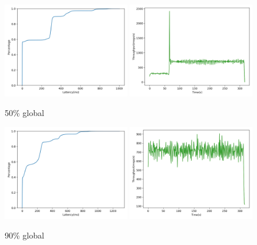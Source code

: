 \begin{figure}[!htb]
  \centering
  \includegraphics[width=0.49\textwidth,height=\textheight,keepaspectratio]{img/global50_lat.png}
  \includegraphics[width=0.49\textwidth,height=\textheight,keepaspectratio]{img/global50_tp.png}
  \caption{ 50\% global }
  \label{fig:global50-performance}
\end{figure}

\begin{figure}[!htb]
  \centering
  \includegraphics[width=0.49\textwidth,height=\textheight,keepaspectratio]{img/global10_lat.png}
  \includegraphics[width=0.49\textwidth,height=\textheight,keepaspectratio]{img/global10_tp.png}
  \caption{ 90\% global }
  \label{fig:global10-performance}
\end{figure}

